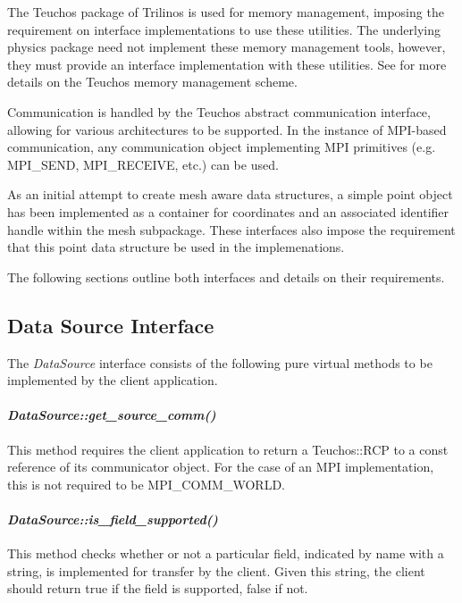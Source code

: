 \documentclass[letterpaper]{article}
\begin{document}
The Teuchos package of Trilinos is used for memory management,
imposing the requirement on interface implementations to use these
utilities. The underlying physics package need not implement these
memory management tools, however, they must provide an interface
implementation with these utilities. See \cite{Bartlett_2010} for more
details on the Teuchos memory management scheme.

Communication is handled by the Teuchos abstract communication
interface, allowing for various architectures to be supported. In the
instance of MPI-based communication, any communication object
implementing MPI primitives (e.g. MPI\_SEND, MPI\_RECEIVE, etc.) can
be used. 

As an initial attempt to create mesh aware data structures, a simple
point object has been implemented as a container for coordinates and
an associated identifier handle within the mesh subpackage. These
interfaces also impose the requirement that this point data structure
be used in the implemenations.

The following sections outline both interfaces and details on their
requirements. 

\subsection{Data Source Interface}
The {\sl DataSource} interface consists of the following pure
virtual methods to be implemented by the client application.

\paragraph{\sl DataSource::get\_source\_comm()}
This method requires the client application to return a Teuchos::RCP
to a const reference of its communicator object. For the case of an
MPI implementation, this is not required to be MPI\_COMM\_WORLD.

\paragraph{\sl DataSource::is\_field\_supported()}
This method checks whether or not a particular field, indicated by
name with a string, is implemented for transfer by the client. Given
this string, the client should return true if the field is supported,
false if not.
\end{document}

